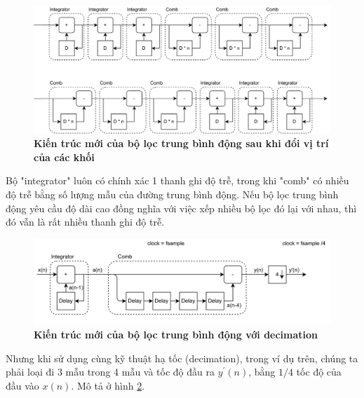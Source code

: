 \begin{figure}[ht!]
    \centering
    \includegraphics[width=14cm]{Images/Chuong2/cic/cic_5.png}
    \caption[Kiến trúc mới của bộ lọc trung bình động sau khi đổi vị trí của các khối]{\bfseries \fontsize{12pt}{0pt}\selectfont Kiến trúc mới của bộ lọc trung bình động sau khi đổi vị trí của các khối}
    \label{cic_5}
\end{figure}
Bộ "integrator" luôn có chính xác 1 thanh ghi độ trễ, trong khi "comb" có nhiều độ trễ bằng số lượng mẫu của đường trung bình động. Nếu bộ lọc trung bình động yêu cầu độ dài cao đồng nghĩa với việc xếp nhiều bộ lọc đó lại với nhau, thì đó vẫn là rất nhiều thanh ghi độ trễ.

\begin{figure}[H]
    \centering
    \includegraphics[width=14cm]{Images/Chuong2/cic/cic_6.png}
    \caption[Kiến trúc mới của bộ lọc trung bình động với decimation]{\bfseries \fontsize{12pt}{0pt}\selectfont Kiến trúc mới của bộ lọc trung bình động với decimation}
    \label{cic_6}
\end{figure}
Nhưng khi sử dụng cùng kỹ thuật hạ tốc (decimation), trong ví dụ trên, chúng ta phải loại đi 3 mẫu trong 4 mẫu và tốc độ đầu ra $y^\prime(n)$, bằng $1/4$ tốc độ của đầu vào $x(n)$. Mô tả ở hình \ref{cic_6}.

